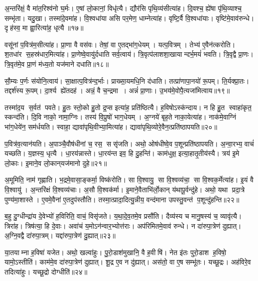 अ॒न्तरि॑क्षं॒ वै मा॑त॒रिश्व॑नो घ॒र्मः।
ए॒षां लो॒कानां॒ विधृ॑त्यै।
द्यौर॑सि पृथि॒व्य॑सीत्या॑ह।
दि॒वश्च॒ ह्ये॑षा पृ॑थि॒व्याश्च॒ सम्भृ॑ता।
यदु॒खा।
तस्मा॑दे॒वमा॑ह।
वि॒श्वधा॑या असि पर॒मेण॒ धाम्नेत्या॑ह।
वृष्टि॒र्वै वि॒श्वधा॑याः।
वृष्टि॑मे॒वाव॑रुन्धे।
दृह॑स्व॒ मा ह्वा॒रित्या॑ह॒ धृत्यै॥१७॥

वसू॑नां प॒वित्र॑म॒सीत्या॑ह।
प्रा॒णा वै वस॑वः।
तेषां॒ वा ए॒तद्भा॑ग॒धेयम्।
यत्प॒वित्रम्।
तेभ्य॑ ए॒वैन॑त्करोति।
श॒तधा॑र स॒हस्र॑धार॒मित्या॑ह।
प्रा॒णेष्वे॒वायु॑र्दधाति सर्व॒त्वाय॑।
त्रि॒वृत्प॑लाशशा॒खायान्दर्भ॒मयं॑ भवति।
त्रि॒वृद्वै प्रा॒णः।
त्रि॒वृत॑मे॒व प्रा॒णं म॑ध्य॒तो यज॑माने दधाति॥१८॥

सौ॒म्यः प॒र्णः स॑योनि॒त्वाय॑।
सा॒क्षात्प॒वित्र॑न्द॒र्भाः।
प्राख्सा॒यमधि॒नि द॑धाति।
तत्प्रा॑णापा॒नयो॑ रू॒पम्।
ति॒र्यक्प्रा॒तः।
तद्दर्श॑स्य रू॒पम्।
दा॒र्श्य ह्ये॑तदह॑।
अन्नं॒ वै च॒न्द्रमा।
अन्नं॑ प्रा॒णाः।
उ॒भय॑मे॒वोपै॒त्यजा॑मित्वाय॥१९॥

तस्मा॑द॒य स॒र्वत॑ पवते।
हु॒तः स्तो॒को हु॒तो द्र॒प्स इत्या॑ह॒ प्रति॑ष्ठित्यै।
ह॒विषोऽस्क॑न्दाय।
न हि हु॒त स्वाहा॑कृत॒ स्कन्द॑ति।
दि॒वि नाको॒ नामा॒ग्निः।
तस्य॑ वि॒प्रुषो॑ भाग॒धेयम्।
अ॒ग्नये॑ बृह॒ते नाका॒येत्या॑ह।
नाक॑मे॒वाग्निं भा॑ग॒धेये॑न॒ सम॑र्धयति।
स्वाहा॒ द्यावा॑पृथि॒वीभ्या॒मित्या॑ह।
द्यावा॑पृथि॒व्योरे॒वैन॒त्प्रति॑ष्ठापयति॥२०॥

प॒वित्र॑व॒त्यान॑यति।
अ॒पाञ्चै॒वौष॑धीनां च॒ रस॒ ससृ॑जति।
अथो॒ ओष॑धीष्वे॒व प॒शून्प्रति॑ष्ठापयति।
अ॒न्वा॒रभ्य॒ वाचं॑ यच्छति।
य॒ज्ञस्य॒ धृत्यै।
धा॒रय॑न्नास्ते।
धा॒रय॑न्त इव॒ हि दु॒हन्ति॑।
काम॑धुक्ष॒ इत्या॒हातृ॒तीय॑स्यै।
त्रय॑ इ॒मे लो॒काः।
इ॒माने॒व लो॒कान्‌यज॑मानो दुहे॥२१॥

अ॒मूमिति॒ नाम॑ गृह्णाति।
भ॒द्रमे॒वासा॒ङ्कर्मा॒ विष्क॑रोति।
सा वि॒श्वायु॒ सा वि॒श्वव्य॑चा॒ सा वि॒श्वक॒र्मेत्या॑ह।
इ॒यं वै वि॒श्वायु॑।
अ॒न्तरि॑क्षं वि॒श्वव्य॑चाः।
अ॒सौ वि॒श्वक॑र्मा।
इ॒माने॒वैताभि॑र्लो॒कान्‌ य॑थापू॒र्वन्दु॑हे।
अथो॒ यथा प्रदा॒त्रे पुण्य॑मा॒शास्ते।
ए॒वमे॒वैना॑ ए॒तदुप॑स्तौति।
तस्मा॒त्प्रादा॒दित्यु॒न्नीय॒ वन्द॑माना उपस्तु॒वन्त॑ प॒शून्दु॑हन्ति॥२२॥

ब॒हु दु॒ग्धीन्द्रा॑य दे॒वेभ्यो॑ ह॒विरिति॒ वाचं॒ विसृ॑जते।
य॒था॒दे॒व॒तमे॒व प्रसौ॑ति।
दैव्य॑स्य च मानु॒षस्य॑ च॒ व्यावृ॑त्यै।
त्रिरा॑ह।
त्रिष॑त्या॒ हि दे॒वाः।
अवा॑चं य॒मोऽन॑न्वार॒भ्योत्त॑राः।
अप॑रिमितमे॒वाव॑ रुन्धे।
न दा॑रुपा॒त्रेण॑ दुह्यात्।
अ॒ग्नि॒वद्वै दा॑रुपा॒त्रम्।
यद्दा॑रुपा॒त्रेण॑ दु॒ह्यात्॥२३॥

या॒तयाम्ना ह॒विषा॑ यजेत।
अथो॒ खल्वा॑हुः।
पु॒रो॒डाश॑मुखानि॒ वै ह॒वीषि॑।
नेत इ॑तः पुरो॒डाश ह॒विषो॒ यामो॒ऽस्तीति॑।
काम॑मे॒व दा॑रुपा॒त्रेण॑ दुह्यात्।
शू॒द्र ए॒व न दु॑ह्यात्।
अस॑तो॒ वा ए॒ष सम्भू॑तः।
यच्छू॒द्रः।
अह॑विरे॒व तदित्या॑हुः।
यच्छू॒द्रो दोग्धीति॑॥२४॥

